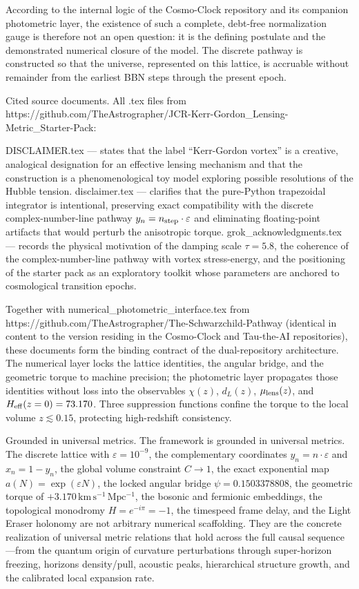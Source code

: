 According to the internal logic of the Cosmo-Clock repository and its companion photometric layer, the existence of such a complete, debt-free normalization gauge is therefore not an open question: it is the defining postulate and the demonstrated numerical closure of the model. The discrete pathway is constructed so that the universe, represented on this lattice, is accruable without remainder from the earliest BBN steps through the present epoch.

Cited source documents.  
All .tex files from https://github.com/TheAstrographer/JCR-Kerr-Gordon_Lensing-Metric_Starter-Pack:

DISCLAIMER.tex — states that the label “Kerr-Gordon vortex” is a creative, analogical designation for an effective lensing mechanism and that the construction is a phenomenological toy model exploring possible resolutions of the Hubble tension.
disclaimer.tex — clarifies that the pure-Python trapezoidal integrator is intentional, preserving exact compatibility with the discrete complex-number-line pathway \(y_n = n_{\rm step}\cdot\varepsilon\) and eliminating floating-point artifacts that would perturb the anisotropic torque.
grok_acknowledgments.tex — records the physical motivation of the damping scale \(\tau=5.8\), the coherence of the complex-number-line pathway with vortex stress-energy, and the positioning of the starter pack as an exploratory toolkit whose parameters are anchored to cosmological transition epochs.

Together with numerical_photometric_interface.tex from https://github.com/TheAstrographer/The-Schwarzchild-Pathway (identical in content to the version residing in the Cosmo-Clock and Tau-the-AI repositories), these documents form the binding contract of the dual-repository architecture. The numerical layer locks the lattice identities, the angular bridge, and the geometric torque to machine precision; the photometric layer propagates those identities without loss into the observables \(\chi(z)\), \(d_L(z)\), \(\mu_{\rm lens}(z)\), and \(H_{\rm eff}(z=0)=73.170\). Three suppression functions confine the torque to the local volume \(z\lesssim 0.15\), protecting high-redshift consistency.

Grounded in universal metrics.  
The framework is grounded in universal metrics. The discrete lattice with \(\varepsilon=10^{-9}\), the complementary coordinates \(y_n=n\cdot\varepsilon\) and \(x_n=1-y_n\), the global volume constraint \(C\to 1\), the exact exponential map \(a(N)=\exp(\varepsilon N)\), the locked angular bridge \(\psi=0.1503378808\), the geometric torque of \(+3.170\,\mathrm{km\,s^{-1}\,Mpc^{-1}}\), the bosonic and fermionic embeddings, the topological monodromy \(H=e^{-i\pi}=-1\), the timespeed frame delay, and the Light Eraser holonomy are not arbitrary numerical scaffolding. They are the concrete realization of universal metric relations that hold across the full causal sequence—from the quantum origin of curvature perturbations through super-horizon freezing, horizons density/pull, acoustic peaks, hierarchical structure growth, and the calibrated local expansion rate.

